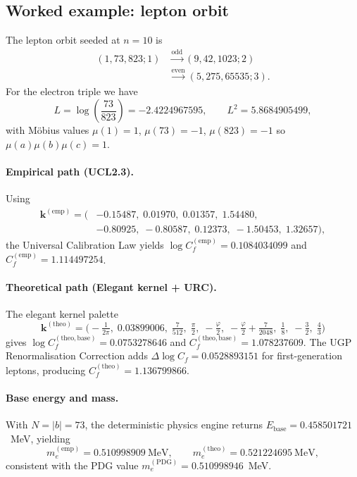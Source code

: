 \documentclass[9pt,twocolumn]{extarticle}
\begin{document}
\subsection{Worked example: lepton orbit}
The lepton orbit seeded at $n=10$ is
\begin{align*}
(1,73,823;1) &\xrightarrow{\text{odd}} (9,42,1023;2) \\
            &\xrightarrow{\text{even}} (5,275,65535;3).
\end{align*}
For the electron triple we have
\[
L = \log\!\left(\frac{73}{823}\right) = -2.4224967595, \qquad L^2 = 5.8684905499,
\]
with Möbius values $\mu(1)=1$, $\mu(73)=-1$, $\mu(823)=-1$ so $\mu(a)\mu(b)\mu(c)=1$.

\paragraph{Empirical path (UCL2.3).} Using
\begin{align*}
\boldsymbol{k}^{(\mathrm{emp})} = (&-0.15487,\;0.01970,\;0.01357,\;1.54480,\\
                                    &-0.80925,\;-0.80587,\;0.12373,\;-1.50453,\;1.32657),
\end{align*}
the Universal Calibration Law yields $\log C_f^{(\mathrm{emp})} = 0.1084034099$ and $C_f^{(\mathrm{emp})} = 1.114497254$.

\paragraph{Theoretical path (Elegant kernel + URC).} The elegant kernel palette
\[
\boldsymbol{k}^{(\mathrm{theo})} = \big(-\tfrac{1}{2\pi},\;0.03899006,\;\tfrac{7}{512},\;\tfrac{\pi}{2},\;-\tfrac{\varphi}{2},\;-\tfrac{\varphi}{2}+\tfrac{7}{2048},\;\tfrac18,\;-\tfrac32,\;\tfrac43\big)
\]
gives $\log C_f^{(\mathrm{theo,base})} = 0.0753278646$ and $C_f^{(\mathrm{theo,base})} = 1.078237609$. The UGP Renormalisation Correction adds $\Delta\log C_f = 0.0528893151$ for first-generation leptons, producing $C_f^{(\mathrm{theo})} = 1.136799866$.

\paragraph{Base energy and mass.} With $N=|b|=73$, the deterministic physics engine returns $E_{\text{base}} = 0.458501721$~MeV, yielding
\[
m_e^{(\mathrm{emp})} = 0.510998909~\text{MeV}, \qquad m_e^{(\mathrm{theo})} = 0.521224695~\text{MeV},
\]
consistent with the PDG value $m_e^{\mathrm{(PDG)}} = 0.510998946$~MeV.
\end{document}
